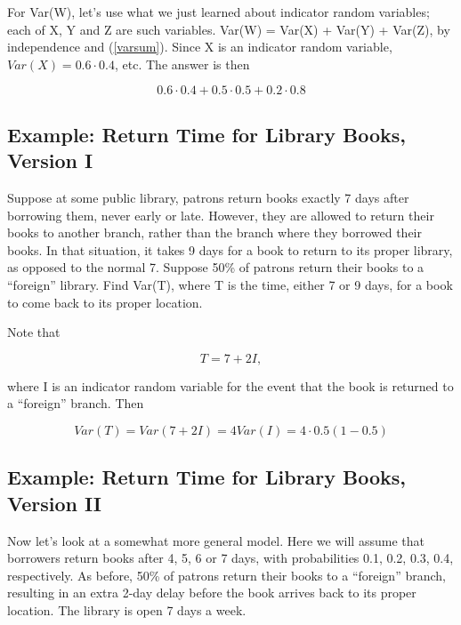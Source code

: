 For Var(W), let's use what we just learned about indicator random
variables; each of X, Y and Z are such variables.  Var(W) = Var(X) +
Var(Y) + Var(Z), by independence and (\ref{varsum}).  Since X is an
indicator random variable, $Var(X) = 0.6 \cdot 0.4$, etc.  The answer is
then

\begin{equation}
0.6 \cdot 0.4 +
0.5 \cdot 0.5 +
0.2 \cdot 0.8
\end{equation}

\subsection{Example:  Return Time for Library Books, Version I}

Suppose at some public library, patrons return books
exactly 7 days after borrowing them, never early or late.  However, they
are allowed to return their books to another branch, rather than the
branch where they borrowed their books.  In that situation, it takes 9
days for a book to return to its proper library, as opposed to the
normal 7.  Suppose 50\% of patrons return their books to a ``foreign''
library.  Find Var(T), where T is the time, either 7 or 9 days, for a
book to come back to its proper location.

Note that

\begin{equation}
T = 7 + 2 I, 
\end{equation}

where I is an indicator random variable for the event that the book is
returned to a ``foreign'' branch.  Then

\begin{equation}
Var(T) = Var(7 + 2I) =  4 Var(I) = 4 \cdot 0.5 (1 - 0.5)
\end{equation}

\subsection{Example:  Return Time for Library Books, Version II}

Now let's look at a somewhat more general model.  Here we will assume
that borrowers return books after 4, 5, 6 or 7 days, with probabilities
0.1, 0.2, 0.3, 0.4, respectively. As before, 50\% of patrons return
their books to a ``foreign'' branch, resulting in an extra 2-day delay
before the book arrives back to its proper location.  The library is
open 7 days a week.

